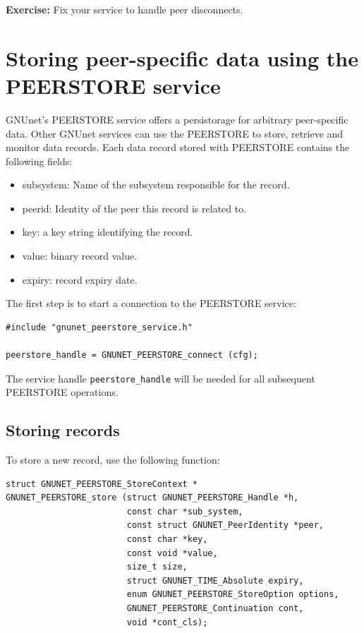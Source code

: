 \documentclass[10pt]{article}
\newcommand{\exercise}[1]{\noindent\begin{boxedminipage}{\textwidth}{\bf Exercise:} #1 \end{boxedminipage}}
\begin{document}
\exercise{Fix your service to handle peer disconnects.}

\section{Storing peer-specific data using the PEERSTORE service}

GNUnet's PEERSTORE service offers a persistorage for arbitrary peer-specific data.
Other GNUnet services can use the PEERSTORE to store, retrieve and monitor data records.
Each data record stored with PEERSTORE contains the following fields:

\begin{itemize}
\itemsep0em
  \item subsystem: Name of the subsystem responsible for the record.
  \item peerid: Identity of the peer this record is related to.
  \item key: a key string identifying the record.
  \item value: binary record value.
  \item expiry: record expiry date.
\end{itemize}

The first step is to start a connection to the PEERSTORE service:
\begin{lstlisting}
#include "gnunet_peerstore_service.h"

peerstore_handle = GNUNET_PEERSTORE_connect (cfg);
\end{lstlisting}
The service handle \lstinline|peerstore_handle| will be needed for all subsequent
PEERSTORE operations.

\subsection{Storing records}

To store a new record, use the following function:
\begin{lstlisting}
struct GNUNET_PEERSTORE_StoreContext *
GNUNET_PEERSTORE_store (struct GNUNET_PEERSTORE_Handle *h,
                        const char *sub_system,
                        const struct GNUNET_PeerIdentity *peer,
                        const char *key,
                        const void *value,
                        size_t size,
                        struct GNUNET_TIME_Absolute expiry,
                        enum GNUNET_PEERSTORE_StoreOption options,
                        GNUNET_PEERSTORE_Continuation cont,
                        void *cont_cls);
\end{lstlisting}
\end{document}
